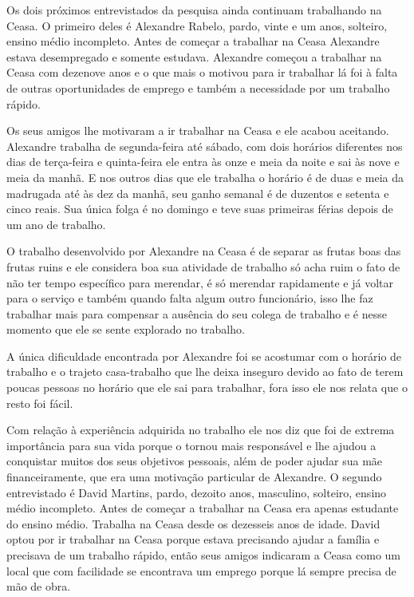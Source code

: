 Os dois próximos entrevistados da pesquisa ainda continuam trabalhando na Ceasa. O primeiro deles é Alexandre Rabelo, pardo, vinte e um anos, solteiro, ensino médio incompleto. Antes de começar a trabalhar na Ceasa Alexandre estava desempregado e somente estudava. Alexandre começou a trabalhar na Ceasa com dezenove anos e o que mais o motivou para ir trabalhar lá foi à falta de outras oportunidades de emprego e também a necessidade por um trabalho rápido.

Os seus amigos lhe motivaram a ir trabalhar na Ceasa e ele acabou aceitando. Alexandre trabalha de segunda-feira até sábado, com dois horários diferentes nos dias de terça-feira e quinta-feira ele entra às onze e meia da noite e sai às nove e meia da manhã. E nos outros dias que ele trabalha o horário é de duas e meia da madrugada até às dez da manhã, seu ganho semanal é de duzentos e setenta e cinco reais. Sua única folga é no domingo e teve suas primeiras férias depois de um ano de trabalho.

O trabalho desenvolvido por Alexandre na Ceasa é de separar as frutas boas das frutas ruins e ele considera boa sua atividade de trabalho só acha ruim o fato de não ter tempo específico para merendar, é só merendar rapidamente e já voltar para o serviço e também quando falta algum outro funcionário, isso lhe faz trabalhar mais para compensar a ausência do seu colega de trabalho e é nesse momento que ele se sente explorado no trabalho.

A única dificuldade encontrada por Alexandre foi se acostumar com o horário de trabalho e o trajeto casa-trabalho que lhe deixa inseguro devido ao fato de terem poucas pessoas no horário que ele sai para trabalhar, fora isso ele nos relata que o resto foi fácil.

Com relação à experiência adquirida no trabalho ele nos diz que foi de extrema importância para sua vida porque o tornou mais responsável e lhe ajudou a conquistar muitos dos seus objetivos pessoais, além de poder ajudar sua mãe financeiramente, que era uma motivação particular de Alexandre.
O segundo entrevistado é David Martins, pardo, dezoito anos, masculino, solteiro, ensino médio incompleto. Antes de começar a trabalhar na Ceasa era apenas estudante do ensino médio. Trabalha na Ceasa desde os dezesseis anos de idade. David optou por ir trabalhar na Ceasa porque estava precisando ajudar a família e precisava de um trabalho rápido, então seus amigos indicaram a Ceasa como um local que com facilidade se encontrava um emprego porque lá sempre precisa de mão de obra.

